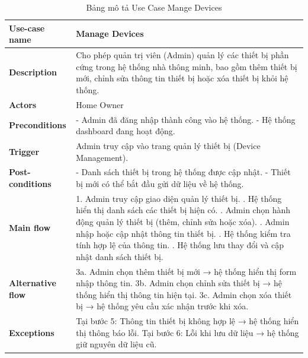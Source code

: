 \documentclass[a4paper,twoside]{article}
\begin{document}
\begin{table}[H]
\centering
\begin{tabular}{|p{4cm}|p{11cm}|}
\hline
\textbf{Use-case name} & Manage Devices \\ \hline

\textbf{Description} &
Cho phép quản trị viên (Admin) quản lý các thiết bị phần cứng trong hệ thống
nhà thông minh, bao gồm thêm thiết bị mới, chỉnh sửa thông tin thiết bị
hoặc xóa thiết bị khỏi hệ thống. \\ \hline

\textbf{Actors} &
Home Owner\\ \hline

\textbf{Preconditions} &
- Admin đã đăng nhập thành công vào hệ thống. \newline
- Hệ thống dashboard đang hoạt động. \\ \hline

\textbf{Trigger} &
Admin truy cập vào trang quản lý thiết bị (Device Management). \\ \hline

\textbf{Post-conditions} &
- Danh sách thiết bị trong hệ thống được cập nhật. \newline
- Thiết bị mới có thể bắt đầu gửi dữ liệu về hệ thống. \\ \hline

\textbf{Main flow} &
1. Admin truy cập giao diện quản lý thiết bị. \newline
2. Hệ thống hiển thị danh sách các thiết bị hiện có. \newline
3. Admin chọn hành động quản lý thiết bị (thêm, chỉnh sửa hoặc xóa). \newline
4. Admin nhập hoặc cập nhật thông tin thiết bị. \newline
5. Hệ thống kiểm tra tính hợp lệ của thông tin. \newline
6. Hệ thống lưu thay đổi và cập nhật danh sách thiết bị. \\ \hline

\textbf{Alternative flow} &
3a. Admin chọn thêm thiết bị mới → hệ thống hiển thị form nhập thông tin. \newline
3b. Admin chọn chỉnh sửa thiết bị → hệ thống hiển thị thông tin hiện tại. \newline
3c. Admin chọn xóa thiết bị → hệ thống yêu cầu xác nhận trước khi xóa. \\ \hline

\textbf{Exceptions} &
Tại bước 5: Thông tin thiết bị không hợp lệ → hệ thống hiển thị thông báo lỗi. \newline
Tại bước 6: Lỗi khi lưu dữ liệu → hệ thống giữ nguyên dữ liệu cũ. \\ \hline

\end{tabular}
\caption{Bảng mô tả Use Case Mange Devices}
\end{table}
\end{document}
